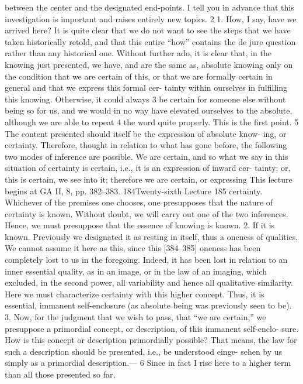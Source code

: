 between the center and the designated end-points. I tell you in advance that
this investigation is important and raises entirely new topics. 2
1. How, I say, have we arrived here? It is quite clear that we do not want
to see the steps that we have taken historically retold, and that this entire
“how” contains the de jure question rather than any historical one. Without
further ado, it is clear that, in the knowing just presented, we have, and are the
same as, absolute knowing only on the condition that we are certain of this, or
that we are formally certain in general and that we express this formal cer-
tainty within ourselves in fulfilling this knowing. Otherwise, it could always 3
be certain for someone else without being so for us, and we would in no way
have elevated ourselves to the absolute, although we are able to repeat 4 the
word quite properly. This is the first point. 5
The content presented should itself be the expression of absolute know-
ing, or certainty. Therefore, thought in relation to what has gone before, the
following two modes of inference are possible. We are certain, and so what we
say in this situation of certainty is certain, i.e., it is an expression of inward cer-
tainty; or, this is certain, we see into it; therefore we are certain, or expressing
This lecture begins at GA II, 8, pp. 382–383.
184Twenty-sixth Lecture
185
certainty. Whichever of the premises one chooses, one presupposes that the
nature of certainty is known. Without doubt, we will carry out one of the two
inferences. Hence, we must presuppose that the essence of knowing is known.
2. If it is known. Previously we designated it as resting in itself, thus a
oneness of qualities. We cannot assume it here as this, since this [384–385]
oneness has been completely lost to us in the foregoing. Indeed, it has been
lost in relation to an inner essential quality, as in an image, or in the law of an
imaging, which excluded, in the second power, all variability and hence all
qualitative similarity. Here we must characterize certainty with this higher
concept. Thus, it is essential, immanent self-enclosure (as absolute being was
previously seen to be).
3. Now, for the judgment that we wish to pass, that “we are certain,” we
presuppose a primordial concept, or description, of this immanent self-enclo-
sure. How is this concept or description primordially possible? That means,
the law for such a description should be presented, i.e., be understood {einge-
sehen} by us simply as a primordial description.— 6
Since in fact I rise here to a higher term than all those presented so far,

